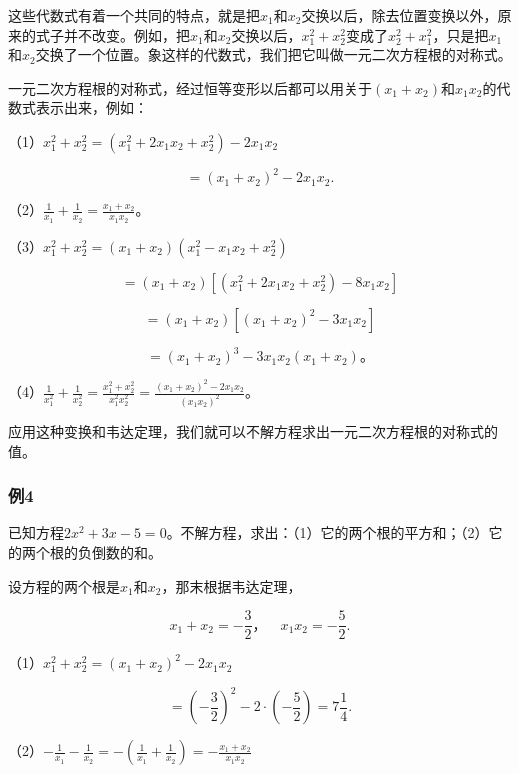 这些代数式有着一个共同的特点，就是把\(x_{1}\)和\(x_{2}\)交换以后，除去位置变换以外，原来的式子并不改变。例如，把\(x_{1}\)和\(x_{2}\)交换以后，\(x_{1}^{2} + x_{2}^{2}\)变成了\(x_{2}^{2} + x_{1}^{2}\)，只是把\(x_{1}\)和\(x_{2}\)交换了一个位置。象这样的代数式，我们把它叫做一元二次方程根的对称式。

一元二次方程根的对称式，经过恒等变形以后都可以用关于\((x_{1} + x_{2})\)和\(x_{1}x_{2}\)的代数式表示出来，例如：

（1）\(x_{1}^{2} + x_{2}^{2} = (x_{1}^{2} + 2x_{1}x_{2} + x_{2}^{2}) - 2x_{1}x_{2}\)

\[
= \left(x _ {1} + x _ {2}\right) ^ {2} - 2 x _ {1} x _ {2}.
\]

（2）\(\frac{1}{x_1} + \frac{1}{x_2} = \frac{x_1 + x_2}{x_1 x_2}\)。

（3）\(x_{1}^{2} + x_{2}^{2} = (x_{1} + x_{2})(x_{1}^{2} - x_{1}x_{2} + x_{2}^{2})\)

\[
= \left(x _ {1} + x _ {2}\right) \left[ \left(x _ {1} ^ {2} + 2 x _ {1} x _ {2} + x _ {2} ^ {2}\right) - 8 x _ {1} x _ {2} \right]
\]

\[
= \left(x _ {1} + x _ {2}\right) \left[ \left(x _ {1} + x _ {2}\right) ^ {2} - 3 x _ {1} x _ {2} \right]
\]

\[
= \left(x _ {1} + x _ {2}\right) ^ {3} - 3 x _ {1} x _ {2} \left(x _ {1} + x _ {2}\right)\text{。}
\]

（4）\(\frac{1}{x_1^2} + \frac{1}{x_2^2} = \frac{x_1^2 + x_2^2}{x_1^2 x_2^2} = \frac{(x_1 + x_2)^2 - 2x_1x_2}{(x_1x_2)^2}\)。

应用这种变换和韦达定理，我们就可以不解方程求出一元二次方程根的对称式的值。

\subsubsection{例4}

已知方程\(2x^{2} + 3x - 5 = 0\)。不解方程，求出：（1）它的两个根的平方和；（2）它的两个根的负倒数的和。

 设方程的两个根是\(x_{1}\)和\(x_{2}\)，那末根据韦达定理，

\[
x _ {1} + x _ {2} = - \frac{3}{2}\text{，} \quad x _ {1} x _ {2} = - \frac{5}{2}.
\]

（1）\(x_{1}^{2} + x_{2}^{2} = (x_{1} + x_{2})^{2} - 2x_{1}x_{2}\)

\[
= \left(- \frac{3}{2}\right) ^ {2} - 2 \cdot \left(- \frac{5}{2}\right) = 7 \frac{1}{4}.
\]

（2）\(-\frac{1}{x_1} - \frac{1}{x_2} = -\left(\frac{1}{x_1} + \frac{1}{x_2}\right) = -\frac{x_1 + x_2}{x_1 x_2}\)

